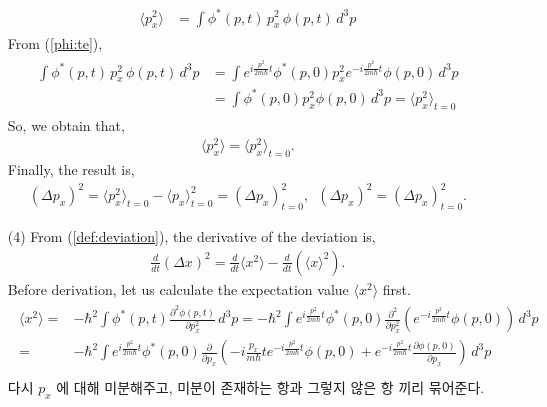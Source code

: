 \documentclass[floatfix,nofootinbib,superscriptaddress,fleqn]{revtex4}
\begin{document}
\begin{itemize}
  \begin{align*}
    \begin{split}
      \langle p_x^2 \rangle &= \int \phi^*(p,t)\,p^2_x\,\phi(p,t)\,d^3p
    \end{split}
  \end{align*}
  From (\ref{phi:te}),
  \begin{align*}
    \begin{split}
      \int \phi^*(p,t)\,p^2_x\,\phi(p,t)\,d^3p
      &=\int e^{i\frac{p^2}{2m\hbar}t}\phi^*(p,0)p^2_x 
      e^{-i\frac{p^2}{2m\hbar}t}\phi(p,0)\,d^3p  \\
      &=\int\phi^*(p,0)p^2_x\phi(p,0)\,d^3p =\langle p^2_x \rangle_{t=0}
    \end{split}      
  \end{align*}
  So, we obtain that,
  \begin{align}
    \langle p_x^2 \rangle=\langle p_x^2 \rangle_{t=0}.
  \end{align}
Finally, the result is,
\begin{align}
  (\Delta p_x)^2 = \langle p_x^2\rangle_{t=0}
  -\langle p_x \rangle^2_{t=0}
  =(\Delta p_x)^2_{t=0}, 
  \,\,\, (\Delta p_x)^2=(\Delta p_x)^2_{t=0}. 
\end{align}
  \item[(4)] From (\ref{def:deviation}), the derivative of the deviation is,
  \begin{align}
    \frac{d}{dt}(\Delta x)^2=\frac{d}{dt}\langle x^2\rangle
    -\frac{d}{dt}\left(\langle x \rangle^2\right). 
  \end{align}
  Before derivation, let us calculate the expectation value 
  $\langle x^2 \rangle$ first.
  \begin{align*}
    \begin{split}  
      \langle x^2 \rangle =& -\hbar^2\int\phi^*(p,t)
      \frac{\partial^2\phi(p,t)}{\partial p_x^2}\,d^3p
      =  -\hbar^2\int e^{i\frac{p^2}{2m\hbar}t}\phi^*(p,0)
      \frac{\partial^2}{\partial p_x^2}
      \left(e^{-i\frac{p^2}{2m\hbar}t}\phi(p,0)\right)\,d^3p  \\
      =& -\hbar^2\int e^{i\frac{p^2}{2m\hbar}t}\phi^*(p,0)
      \frac{\partial}{\partial p_x}
      \left(-i\frac{p_x}{m\hbar}te^{-i\frac{p^2}{2m\hbar}t}\phi(p,0)
      +e^{-i\frac{p^2}{2m\hbar}t}
      \frac{\partial\phi(p,0)}{\partial p_x}\right)\,d^3p  \\
    \end{split}
  \end{align*}
다시 $p_x$ 에 대해 미분해주고, 미분이 존재하는 항과 그렇지 않은 항 끼리 묶어준다.

\end{itemize}
\end{document}
